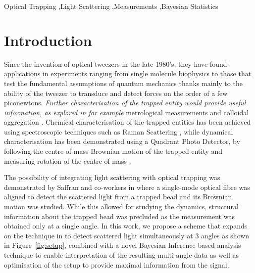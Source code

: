 \documentclass[final,  3p]{elsarticle}
\begin{document}
\begin{frontmatter}
\begin{keyword}
	Optical Trapping \sep Light Scattering \sep Measurements \sep Bayesian Statistics 
\end{keyword}

\end{frontmatter}

\section{Introduction}
\label{sec:Intro}

Since the invention of optical tweezers in the late 1980's, they have
found applications in experiments ranging from single molecule
biophysics \cite{Bustamante2021Biophysics} to those that test the
fundamental assumptions of quantum mechanics \cite{yin2013large}
thanks mainly to the ability of the tweezer to transduce and detect
forces on the order of a few piconewtons. \textit{Further
  characterisation of the trapped entity would provide useful
  information, as explored in for example} metrological measurements
\cite{arita2020coherent} and colloidal aggregation
\cite{burns1990optical}. Chemical characterisation of the trapped
entities has been achieved using spectroscopic techniques such as
Raman Scattering \cite{gupta2014raman}, while dynamical
characterisation has been demonstrated using a Quadrant Photo
Detector, by following the centre-of-mass Brownian motion of the
trapped entity \cite{friedrich2012tuning} and measuring rotation of
the centre-of-mass \cite{yifat2021facile}.

The possibility of integrating light scattering with optical trapping was demonstrated by Saffran and co-workers in \cite{Bar-Ziv_1998} where a single-mode optical fibre was aligned to detect the scattered
light from a trapped bead and its Brownian motion was studied.  While this allowed for studying the dynamics, structural information about the trapped bead was precluded as the measurement was obtained only at a single angle.  In this work, we propose a scheme that expands on the technique in \cite{Bar-Ziv_1998} to detect scattered light simultaneously at 3 angles as shown in Figure~\ref{fig:setup}, combined with a novel Bayesian Inference based analysis technique to enable interpretation of the resulting multi-angle data as well as optimisation of the setup to provide maximal information from the signal.
\end{document}
